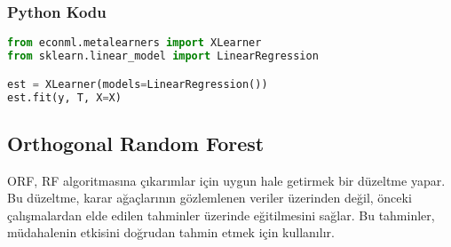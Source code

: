 \subsubsection{Python Kodu}

\begin{lstlisting}[language=Python, caption=econml'de Meta-Learner örneği.]
from econml.metalearners import XLearner
from sklearn.linear_model import LinearRegression

est = XLearner(models=LinearRegression())
est.fit(y, T, X=X)
\end{lstlisting}

\newpage

\subsection{Orthogonal Random Forest}
ORF, RF algoritmasına çıkarımlar için uygun hale getirmek bir düzeltme yapar. Bu düzeltme, karar ağaçlarının gözlemlenen veriler üzerinden değil, önceki çalışmalardan elde edilen tahminler üzerinde eğitilmesini sağlar. Bu tahminler, müdahalenin etkisini doğrudan tahmin etmek için kullanılır.

\newpage
